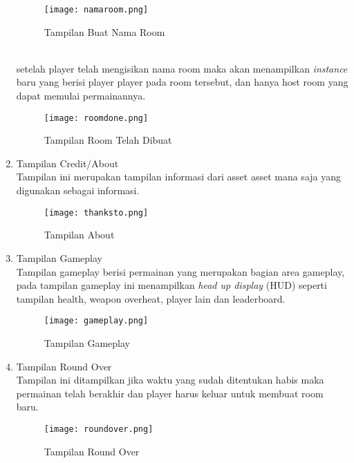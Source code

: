 \begin{enumerate}
\begin{figure}[h]
        \centering
        \texttt{[image: namaroom.png]}
        \caption{Tampilan Buat Nama Room}
        \label{fig:namaroom}
    \end{figure}
    \\ setelah player telah mengisikan nama room maka akan menampilkan \textit{instance} baru yang berisi player player pada room tersebut, dan hanya host room yang dapat memulai permainannya.
    \newpage
    \begin{figure}[h]
        \centering
        \texttt{[image: roomdone.png]}
        \caption{Tampilan Room Telah Dibuat}
        \label{fig:roomdone}
    \end{figure}
    \item Tampilan Credit/About \\
    Tampilan ini merupakan tampilan informasi dari asset asset mana saja yang digunakan sebagai informasi.
    \begin{figure}[h]
        \centering
        \texttt{[image: thanksto.png]}
        \caption{Tampilan About}
        \label{fig:thanksto}
    \end{figure}
    \item Tampilan Gameplay \\
    Tampilan gameplay berisi permainan yang merupakan bagian area gameplay, pada tampilan gameplay ini menampilkan \textit{head up display} (HUD) seperti tampilan health, weapon overheat, player lain dan leaderboard.
    \newpage
    \begin{figure}[h]
        \centering
        \texttt{[image: gameplay.png]}
        \caption{Tampilan Gameplay}
        \label{fig:gameplay}
    \end{figure}
    \item Tampilan Round Over \\
    Tampilan ini ditampilkan jika waktu yang sudah ditentukan habis maka permainan telah berakhir dan player harus keluar untuk membuat room baru.
    \begin{figure}[h]
        \centering
        \texttt{[image: roundover.png]}
        \caption{Tampilan Round Over}
        \label{fig:roundover}
    \end{figure}
\end{enumerate}